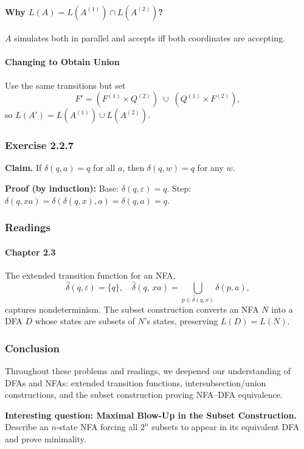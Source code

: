 \documentclass{article}
\theoremstyle{theorem}
\theoremstyle{definition}
\theoremstyle{remark}
\begin{document}
\paragraph*{Why \(L(A)=L(A^{(1)})\cap L(A^{(2)})\)?}
\(A\) simulates both in parallel and accepts iff both coordinates are accepting.

\paragraph*{Changing to Obtain Union}
Use the same transitions but set
\[
  F' = (F^{(1)}\times Q^{(2)})\;\cup\;(Q^{(1)}\times F^{(2)}),
\]
so \(L(A')=L(A^{(1)})\cup L(A^{(2)})\).

\subsubsection*{Exercise 2.2.7}
\textbf{Claim.} If \(\delta(q,a)=q\) for all \(a\), then \(\delta(q,w)=q\) for any \(w\).

\textbf{Proof (by induction):}
Base: \(\delta(q,\varepsilon)=q\).  
Step: \(\delta(q,xa)=\delta(\delta(q,x),a)=\delta(q,a)=q\).

\subsubsection{Readings}

\paragraph*{Chapter 2.3}
The extended transition function for an NFA,
\[
  \hat{\delta}(q,\varepsilon)=\{q\},\quad
  \hat{\delta}(q,\,xa)=\bigcup_{p\in\hat{\delta}(q,x)}\delta(p,a),
\]
captures nondeterminism.  The subset construction converts an NFA \(N\) into a DFA \(D\) whose states are subsets of \(N\)’s states, preserving \(L(D)=L(N)\).

\subsubsection{Conclusion}
Throughout these problems and readings, we deepened our understanding of DFAs and NFAs: extended transition functions, intersubsection/union constructions, and the subset construction proving NFA–DFA equivalence.

\textbf{Interesting question: Maximal Blow-Up in the Subset Construction.}\\
Describe an \(n\)-state NFA forcing all \(2^n\) subsets to appear in its equivalent DFA and prove minimality.
\end{document}

